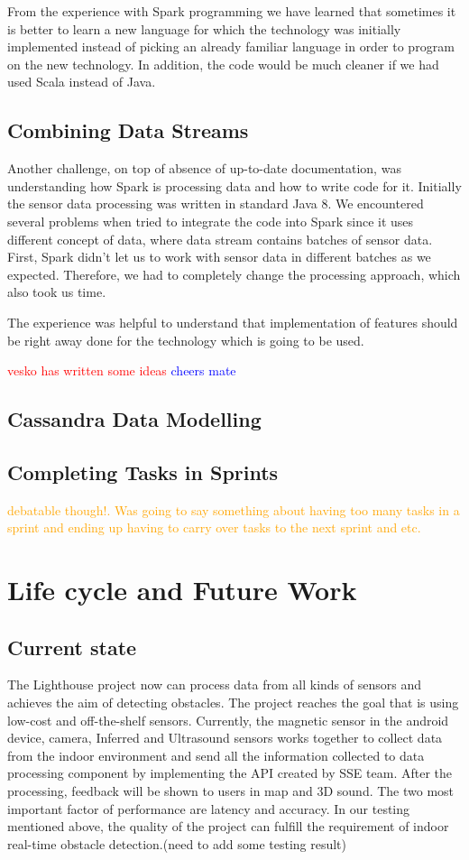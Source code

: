 \documentclass[prodmode,acmtosem]{acmsmall} %
\begin{document}
From the experience with Spark programming we have learned that sometimes it is better to learn a new language for which the technology was initially implemented instead of picking an already familiar language in order to program on the new technology. In addition, the code would be much cleaner if we had used Scala instead of Java.

\subsection{Combining Data Streams}
Another challenge, on top of absence of up-to-date documentation, was understanding how Spark is processing data and how to write code for it. Initially the sensor data processing was written in standard Java 8. We encountered several problems when tried to integrate the code into Spark since it uses different concept of data, where data stream contains batches of sensor data. First, Spark didn't let us to work with sensor data in different batches as we expected. Therefore, we had to completely change the processing approach, which also took us time.

The experience was helpful to understand that implementation of features should be right away done for the technology which is going to be used.

\textcolor{red}{vesko has written some ideas} \textcolor{blue}{cheers mate}

\subsection{Cassandra Data Modelling}

\subsection{Completing Tasks in Sprints}\textcolor{orange}{debatable though!. Was going to say something about having too many tasks in a sprint and ending up having to carry over tasks to the next sprint and etc.}

\section{Life cycle and Future Work}
\subsection{Current state}
The Lighthouse project now can process data from all kinds of sensors and achieves the aim of detecting obstacles. The project reaches the goal that is using low-cost and off-the-shelf sensors. Currently, the magnetic sensor in the android device, camera, Inferred and Ultrasound sensors works together to collect data from the indoor environment and send all the information collected to data processing component by implementing the API created by SSE team. After the processing, feedback will be shown to users in map and 3D sound. The two most important factor of performance are latency and accuracy. In our testing mentioned above, the quality of the project can fulfill the requirement of indoor real-time obstacle detection.(need to add some testing result)
\end{document}
